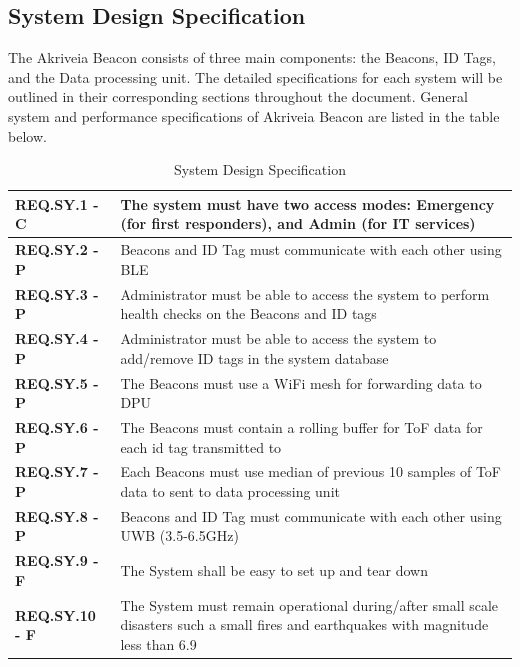 \subsection{System Design Specification}
\medskip
The Akriveia Beacon consists of three main components: the Beacons, ID Tags, and the Data processing unit. The detailed specifications for each system will be outlined in their corresponding sections throughout the document. General system and performance specifications of Akriveia Beacon are listed in the table below.
\medskip
\bgroup
\def\arraystretch{1.5}
\begin{table}[H]
\centering
\begin{tabular}{ | m{3cm} | m{12.5cm} |}
\hline
\textbf{REQ.SY.1 - C} & The system must have two access modes: Emergency (for first responders), and Admin (for IT services)\\
\hline
\textbf{REQ.SY.2 - P} & Beacons and ID Tag must communicate with each other using BLE\\
\hline
\textbf{REQ.SY.3 - P} & Administrator must be able to access the system to perform health checks on the Beacons and ID tags \\
\hline
\textbf{REQ.SY.4 - P} & Administrator must be able to access the system to add/remove ID tags in the system database \\
\hline
\textbf{REQ.SY.5 - P} & The Beacons must use a WiFi mesh for forwarding data to DPU\\
\hline
\textbf{REQ.SY.6 - P} & The Beacons must contain a rolling buffer for ToF data for each id tag transmitted to\\
\hline
\textbf{REQ.SY.7 - P} & Each Beacons must use median of previous 10 samples of ToF data to sent to data processing unit\\
\hline
\textbf{REQ.SY.8 - P} & Beacons and ID Tag must communicate with each other using UWB (3.5-6.5GHz)\\
\hline
\textbf{REQ.SY.9 - F} & The System shall be easy to set up and tear down\\
\hline
\textbf{REQ.SY.10 - F} & The System must remain operational during/after small scale disasters such a small fires and earthquakes with magnitude less than 6.9\\
\hline
\end{tabular}
\caption{System Design Specification}
\end{table}
















